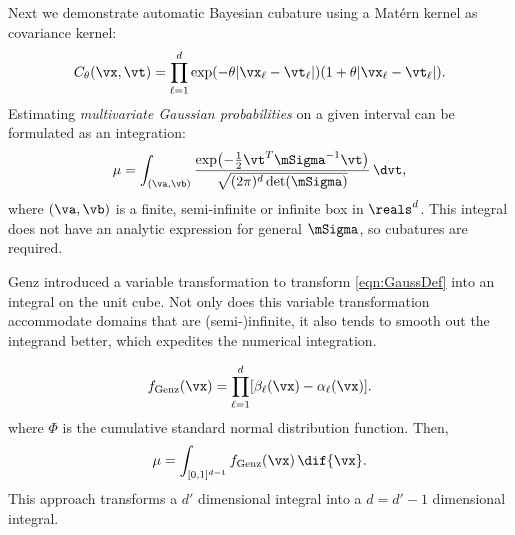 Next we demonstrate automatic Bayesian cubature using a Mat\'ern kernel as covariance kernel:
\begin{align}
\label{eqn:matern_kernel}
C_{\theta}(\vx, \vt) = \prod_{\ell=1}^d \exp(-\theta|\vx_\ell-\vt_\ell|)(1+\theta |\vx_\ell-\vt_\ell|).
\end{align}
Estimating \emph{multivariate Gaussian probabilities} on a given interval can be formulated as an integration:
\begin{equation}
\label{eqn:GaussDef}
\mu = \int_{(\va,\vb)} \frac{\exp\bigl(- \frac 12 \vt^T \mSigma^{-1} \vt \bigr)}{\sqrt{(2 \pi)^d \det(\mSigma)}} \, \dvt,
\end{equation}
where $(\va,\vb)$ is a finite, semi-infinite or infinite box in $\reals^d$.  This integral does not have an analytic expression for general $\mSigma$, so cubatures are required.  

Genz \cite{Gen93} introduced a variable transformation to transform \eqref{eqn:GaussDef} into an integral on the unit cube.  Not only does this variable transformation accommodate domains that are (semi-)infinite, it also tends to smooth out the integrand better, which expedites the numerical integration.  

\begin{align}
\label{eqn:fGenzdef}
f_{\text{Genz}}(\vx) = \prod_{\ell=1}^d [\beta_\ell(\vx) - \alpha_\ell(\vx)].
\end{align}
where $\Phi$ is the cumulative standard normal distribution function.
Then, $$\mu = \int_{[0,1]^{d-1}} f_{\text{Genz}}(\vx) \, \dif{\vx}.$$
This approach transforms a $d'$ dimensional integral into a $d=d'-1$ dimensional integral.

